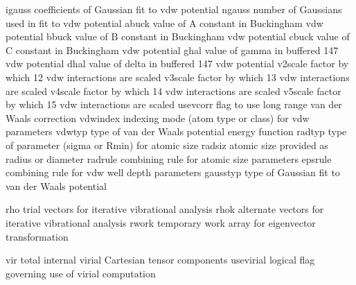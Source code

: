 \documentclass[letterpaper,11pt,english]{sphinxmanual}
\begin{document}
\sphinxAtStartPar
{}

\begin{sphinxVerbatim}[commandchars=\\\{\}]
igauss          coefficients of Gaussian fit to vdw potential
ngauss          number of Gaussians used in fit to vdw potential
abuck           value of \PYGZdq{}A\PYGZdq{} constant in Buckingham vdw potential
bbuck           value of \PYGZdq{}B\PYGZdq{} constant in Buckingham vdw potential
cbuck           value of \PYGZdq{}C\PYGZdq{} constant in Buckingham vdw potential
ghal            value of \PYGZdq{}gamma\PYGZdq{} in buffered 14\PYGZhy{}7 vdw potential
dhal            value of \PYGZdq{}delta\PYGZdq{} in buffered 14\PYGZhy{}7 vdw potential
v2scale         factor by which 1\PYGZhy{}2 vdw interactions are scaled
v3scale         factor by which 1\PYGZhy{}3 vdw interactions are scaled
v4scale         factor by which 1\PYGZhy{}4 vdw interactions are scaled
v5scale         factor by which 1\PYGZhy{}5 vdw interactions are scaled
use\PYGZus{}vcorr       flag to use long range van der Waals correction
vdwindex        indexing mode (atom type or class) for vdw parameters
vdwtyp          type of van der Waals potential energy function
radtyp          type of parameter (sigma or R\PYGZhy{}min) for atomic size
radsiz          atomic size provided as radius or diameter
radrule         combining rule for atomic size parameters
epsrule         combining rule for vdw well depth parameters
gausstyp        type of Gaussian fit to van der Waals potential
\end{sphinxVerbatim}

\sphinxAtStartPar
{}

\begin{sphinxVerbatim}[commandchars=\\\{\}]
rho             trial vectors for iterative vibrational analysis
rhok            alternate vectors for iterative vibrational analysis
rwork           temporary work array for eigenvector transformation
\end{sphinxVerbatim}

\sphinxAtStartPar
{}

\begin{sphinxVerbatim}[commandchars=\\\{\}]
vir             total internal virial Cartesian tensor components
use\PYGZus{}virial      logical flag governing use of virial computation
\end{sphinxVerbatim}
\end{document}
